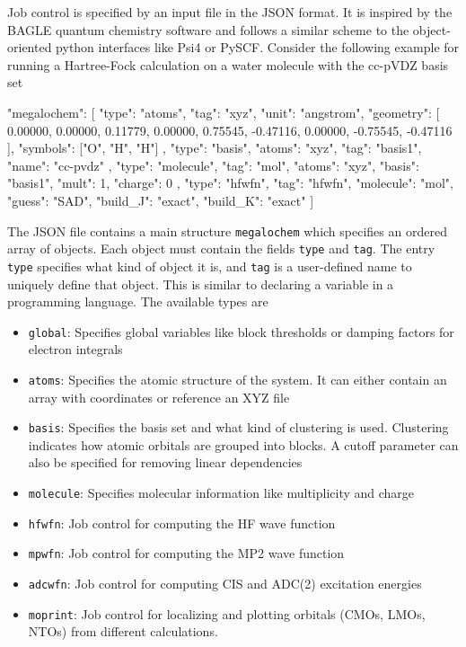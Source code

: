 Job control is specified by an input file in the JSON format. It is inspired by the BAGLE quantum chemistry software \cite{Shi2018} and follows a similar scheme to the object-oriented python interfaces like Psi4 or PySCF. Consider the following example for running a Hartree-Fock calculation on a water molecule with the cc-pVDZ basis set
\begin{code}
{
  "megalochem": [
  {
    "type": "atoms",
    "tag": "xyz",
    "unit": "angstrom",
    "geometry": [
      0.00000,        0.00000,        0.11779,
      0.00000,        0.75545,       -0.47116,
      0.00000,       -0.75545,       -0.47116
    ],
    "symbols": ["O", "H", "H"]
  },
  {
    "type": "basis",
    "atoms": "xyz",
    "tag": "basis1",
    "name": "cc-pvdz"
  },
  {
    "type": "molecule",
    "tag": "mol",
    "atoms": "xyz",
    "basis": "basis1",
    "mult": 1,
    "charge": 0
  },
  {
    "type": "hfwfn",
    "tag": "hfwfn",
    "molecule": "mol",
    "guess": "SAD",
    "build_J": "exact",
    "build_K": "exact"
   }]
}
\end{code}  
\noindent The JSON file contains a main structure \texttt{megalochem} which specifies an ordered array of objects. Each object must contain the fields \texttt{type} and  \texttt{tag}. The entry \texttt{type} specifies what kind of object it is, and \texttt{tag} is a user-defined name to uniquely define that object. This is similar to declaring a variable in a programming language. The available types are
\begin{itemize}
\item \texttt{global}: Specifies global variables like block thresholds or damping factors for electron integrals

\item \texttt{atoms}: Specifies the atomic structure of the system. It can either contain an array with coordinates or reference an XYZ file

\item \texttt{basis}: Specifies the basis set and what kind of clustering is used. Clustering indicates how atomic orbitals are grouped into blocks. A cutoff parameter can also be specified for removing linear dependencies

\item \texttt{molecule}: Specifies molecular information like multiplicity and charge

\item \texttt{hfwfn}: Job control for computing the HF wave function

\item \texttt{mpwfn}: Job control for computing the MP2 wave function

\item \texttt{adcwfn}: Job control for computing CIS and ADC(2) excitation energies

\item \texttt{moprint}: Job control for localizing and plotting orbitals (CMOs, LMOs, NTOs) from different calculations.

\end{itemize} 

